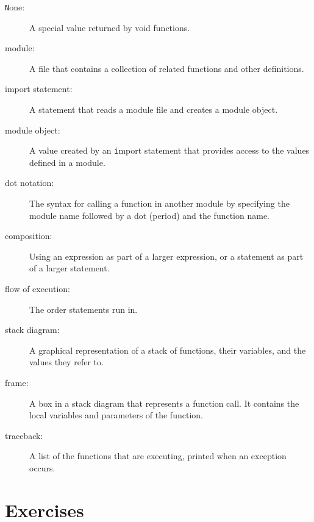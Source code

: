 \documentclass[
DIV=11,
fontsize=12,
twoside,
headinclude=false,
titlepage=firstiscover,
abstract=true,
headsepline=true,
footsepline=true,
chapterprefix=true, %
headings=big,
bibliography=totoc,%
captions=tableheading
]{scrbook}
\theoremstyle{definition}
\begin{document}
\begin{description}
\item[{\texttt None}:]  A special value returned by void functions.

\item[module:] A file that contains a
collection of related functions and other definitions.

\item[import statement:] A statement that reads a module file and creates
a module object.

\item[module object:] A value created by an {\texttt import} statement
that provides access to the values defined in a module.

\item[dot notation:]  The syntax for calling a function in another
module by specifying the module name followed by a dot (period) and
the function name.

\item[composition:] Using an expression as part of a larger expression,
or a statement as part of a larger statement.

\item[flow of execution:]  The order statements run in.

\item[stack diagram:]  A graphical representation of a stack of functions,
their variables, and the values they refer to.

\item[frame:]  A box in a stack diagram that represents a function call.
It contains the local variables and parameters of the function.

\item[traceback:]  A list of the functions that are executing,
printed when an exception occurs.


\end{description}


\section{Exercises}
\end{document}
